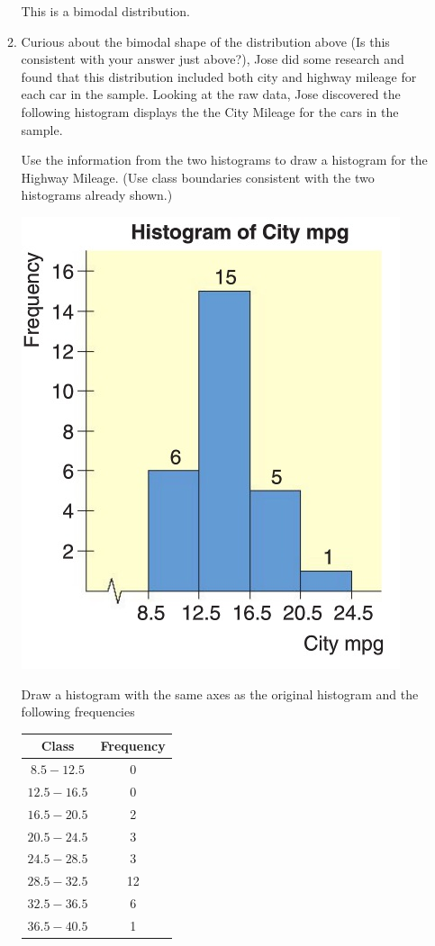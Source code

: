 \documentclass{article}
\newcommand{\answer}[1]{\color{white}#1}
\begin{document}
\begin{enumerate}
\begin{enumerate}
	{\answer{This is a bimodal distribution.}} 
	
	\item Curious about the bimodal shape of the distribution above (Is this consistent with your answer just above?), Jose did some research and found that this distribution included both city and highway mileage for each car in the sample.  Looking at the raw data, Jose discovered the following histogram displays the the City Mileage for the cars in the sample. 
	
	Use the information from the two histograms to draw a histogram for the Highway Mileage. (Use class boundaries consistent with the two histograms already shown.)
	
	\parbox[c]{2in}{\includegraphics[scale=0.25]{WS2_MPGcity.jpg}}
	
	{\answer{\parbox[b][4em][t]{3in}{Draw a histogram with the same axes as the original histogram and the following frequencies 
	\begin{tabular}{c|c}
	Class & Frequency \\
	\hline
	$8.5-12.5$ & 0 \\
	$12.5-16.5$ & 0 \\
	$16.5-20.5$ & 2 \\
	$20.5-24.5$ & 3 \\
	$24.5-28.5$ & 3 \\
	$28.5-32.5$ & 12 \\
	$32.5-36.5$ & 6 \\
	$36.5-40.5$ & 1 \\
	\end{tabular}}}}  \\


\end{enumerate}
\end{enumerate}
\end{document}
